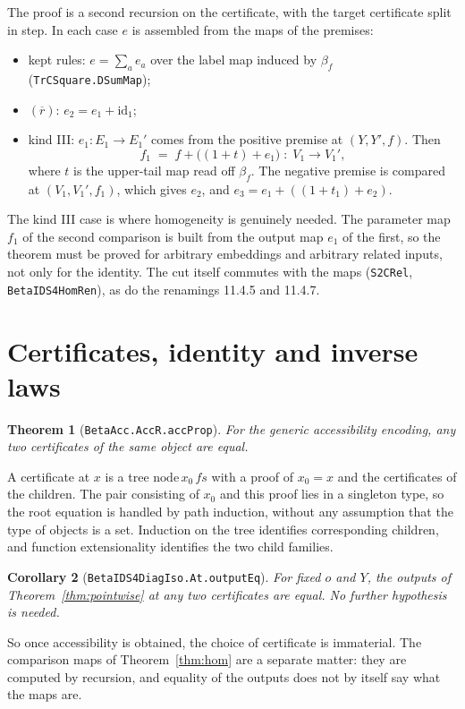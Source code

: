 \documentclass[11pt]{article}
\newtheorem{theorem}{Theorem}[section]
\newtheorem{corollary}[theorem]{Corollary}
\theoremstyle{remark}
\newcommand{\id}{\mathrm{id}}
\renewcommand{\tt}[1]{\texttt{#1}}
\begin{document}
The proof is a second recursion on the certificate, with the target
certificate split in step. In each case $e$ is assembled from the maps of
the premises:
\begin{itemize}
\item kept rules: $e=\sum_a e_a$ over the label map induced by $\beta_f$
(\tt{TrCSquare.DSumMap});
\item $(\overline r)$: $e_2=e_1+\id_1$;
\item kind III: $e_1:E_1\to E_1'$ comes from the positive premise at
$(Y,Y',f)$. Then
\[
 f_1 \;=\; f+\bigl((1+t)+e_1\bigr)\;:\;V_1\to V_1',
\]
where $t$ is the upper-tail map read off $\beta_f$. The negative premise
is compared at $(V_1,V_1',f_1)$, which gives $e_2$, and
$e_3=e_1+((1+t_1)+e_2)$.
\end{itemize}
The kind III case is where homogeneity is genuinely needed. The parameter
map $f_1$ of the second comparison is built from the output map $e_1$ of
the first, so the theorem must be proved for arbitrary embeddings and
arbitrary related inputs, not only for the identity. The cut itself
commutes with the maps (\tt{S2CRel}, \tt{BetaIDS4HomRen}), as do the
renamings 11.4.5 and 11.4.7.

\section{Certificates, identity and inverse laws}

\begin{theorem}[\tt{BetaAcc.AccR.accProp}]\label{thm:accprop}
For the generic accessibility encoding, any two certificates of the same
object are equal.
\end{theorem}

A certificate at $x$ is a tree $\mathrm{node}\,x_0\,fs$ with a proof of
$x_0=x$ and the certificates of the children. The pair consisting of $x_0$
and this proof lies in a singleton type, so the root equation is handled
by path induction, without any assumption that the type of objects is a
set. Induction on the tree identifies corresponding children, and function
extensionality identifies the two child families.

\begin{corollary}[\tt{BetaIDS4DiagIso.At.outputEq}]
For fixed $o$ and $Y$, the outputs of Theorem~\ref{thm:pointwise} at any
two certificates are equal. No further hypothesis is needed.
\end{corollary}

So once accessibility is obtained, the choice of certificate is
immaterial. The comparison maps of Theorem~\ref{thm:hom} are a separate
matter: they are computed by recursion, and equality of the outputs does
not by itself say what the maps are.
\end{document}
